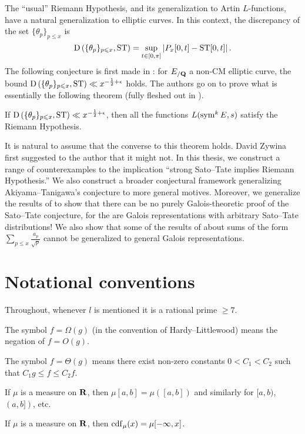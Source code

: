 The ``usual'' Riemann Hypothesis, and its generalization to Artin 
$L$-functions, have a natural generalization to elliptic curves. In this 
context, the discrepancy of the set $\{\theta_p\}_{p\leqslant x}$ is 
\[
	\operatorname{D}\left(\{\theta_p\}_{p\leqslant x},\mathrm{ST}\right) = \sup_{t\in [0,\pi]} \left| P_x[0,t] - \mathrm{ST}[0,t]\right| .
\]
The following conjecture is first made in \cite{akiyama-tanigawa-1999}: for 
$E_{/\mathbf{Q}}$ a non-CM elliptic curve, the bound 
$\operatorname{D}\left(\{\theta_p\}_{p\leqslant x},\mathrm{ST}\right)\ll x^{-\frac 1 2+\epsilon}$ 
holds. The authors go on to prove what is essentially the following theorem 
(fully fleshed out in \cite{mazur-2008}). 

\begin{theorem}
If $\operatorname{D}\left(\{\theta_p\}_{p\leqslant x},\mathrm{ST}\right)\ll x^{-\frac 1 2+\epsilon}$, 
then all the functions $L(\operatorname{sym}^k E, s)$ satisfy the Riemann Hypothesis. 
\end{theorem}

It is natural to assume that the converse to this theorem holds. David Zywina 
first suggested to the author that it might not. In this thesis, we construct a 
range of counterexamples to the implication ``strong Sato--Tate implies 
Riemann Hypothesis.'' We also construct a broader conjectural framework 
generalizing 
Akiyama--Tanigawa's conjecture to more general motives. Moreover, we generalize 
the results of \cite{pande-2011} to show that there can be no purely 
Galois-theoretic proof of the Sato--Tate conjecture, for the are Galois 
representations with arbitrary Sato--Tate distributions! We also show that 
some of the results of \cite{sarnak-2007} about sums of the form 
$\sum_{p\leqslant x} \frac{a_p}{\sqrt p}$ cannot be generalized to general 
Galois representations. 





\section{Notational conventions}

Throughout, whenever $l$ is mentioned it is a rational prime $\geqslant 7$. 

The symbol $f=\Omega(g)$ (in the convention of Hardy--Littlewood) means 
the negation of $f = O(g)$.

The symbol $f = \Theta(g)$ means there exist non-zero constants $0<C_1<C_2$
such that $C_1 g \leqslant f \leqslant C_2 f$. 

If $\mu$ is a measure on $\mathbf{R}$, then $\mu[a,b] = \mu([a,b])$ and similarly 
for $[a,b)$, $(a,b])$, etc. 

If $\mu$ is a measure on $\mathbf{R}$, then $\operatorname{cdf}_\mu(x) = \mu[-\infty,x]$. 
